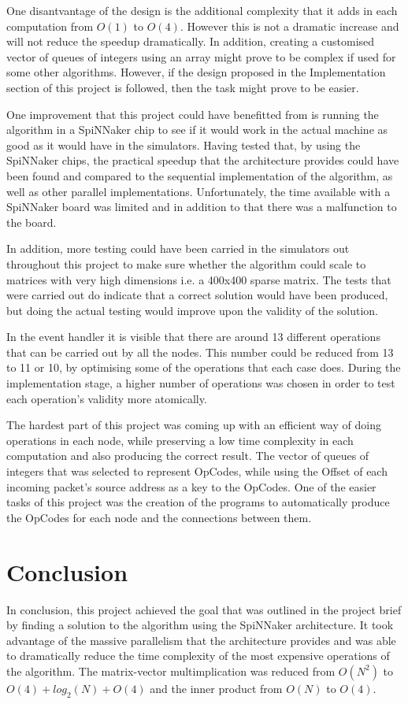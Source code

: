 \documentclass[12pt,a4paper]{article}
\begin{document}
One disantvantage of the design is the additional complexity that it adds in each computation from $O(1)$ to $O(4)$. However this is not a dramatic increase and will not reduce the speedup dramatically. In addition, creating a customised vector of queues of integers using an array might prove to be complex if used for some other algorithms. However, if the design proposed in the Implementation section of this project is followed, then the task might prove to be easier.

One improvement that this project could have benefitted from is running the algorithm in a SpiNNaker chip to see if it would work in the actual machine as good as it would have in the simulators. Having tested that, by using the SpiNNaker chips, the practical speedup that the architecture provides could have been found and compared to the sequential implementation of the algorithm, as well as other parallel implementations. Unfortunately, the time available with a SpiNNaker board was limited and in addition to that there was a malfunction to the board.

In addition, more testing could have been carried in the simulators out throughout this project to make sure whether the algorithm could scale to matrices with very high dimensions i.e. a 400x400 sparse matrix. The tests that were carried out do indicate that a correct solution would have been produced, but doing the actual testing would improve upon the validity of the solution.

In the event handler it is visible that there are around 13 different operations that can be carried out by all the nodes. This number could be reduced from 13 to 11 or 10, by optimising some of the operations that each case does. During the implementation stage, a higher number of operations was chosen in order to test each operation's validity more atomically.

The hardest part of this project was coming up with an efficient way of doing operations in each node, while preserving a low time complexity in each computation and also producing the correct result. The vector of queues of integers that was selected to represent OpCodes, while using the Offset of each incoming packet's source address as a key to the OpCodes. One of the easier tasks of this project was the creation of the programs to automatically produce the OpCodes for each node and the connections between them.
\section{Conclusion}
In conclusion, this project achieved the goal that was outlined in the project brief by finding a solution to the algorithm using the SpiNNaker architecture. It took advantage of the massive parallelism that the architecture provides and was able to dramatically reduce the time complexity of the most expensive operations of the algorithm. The matrix-vector multimplication was reduced from $O(N^2)$ to $O(4) + log_2(N) + O(4)$ and the inner product from $O(N)$ to $O(4)$. 
\end{document}
